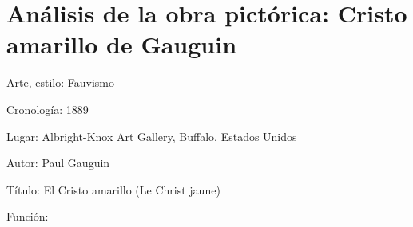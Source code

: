 \section{Análisis de la obra pictórica: Cristo amarillo de Gauguin}

Arte, estilo: Fauvismo

Cronología: 1889

Lugar: Albright-Knox Art Gallery, Buffalo, Estados Unidos

Autor: Paul Gauguin

Título: El Cristo amarillo (Le Christ jaune)

Función: 